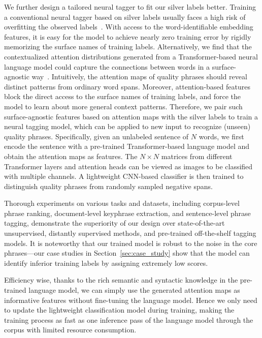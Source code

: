 \documentclass[sigconf]{acmart}
\begin{document}
We further design a tailored neural tagger to fit our silver labels better. 
Training a conventional neural tagger based on silver labels usually faces a high risk of overfitting the observed labels~\cite{liang2020bond}.
With access to the word-identifiable embedding features, it is easy for the model to achieve nearly zero training error by rigidly memorizing the surface names of training labels.
Alternatively, we find that the contextualized attention distributions generated from a Transformer-based neural language model could capture the connections between words in a surface-agnostic way~\cite{kim2019pre}.
Intuitively, the attention maps of quality phrases should reveal distinct patterns from ordinary word spans.
Moreover, attention-based features block the direct access to the surface names of training labels, and force the model to learn about more general context patterns.
Therefore, we pair such surface-agnostic features based on attention maps with the silver labels to train a neural tagging model, which can be applied to new input to recognize (unseen) quality phrases.
Specifically, given an unlabeled sentence of $N$ words, we first encode the sentence with a pre-trained Transformer-based language model and obtain the attention maps as features.
The $N \times N$ matrices from different Transformer layers and attention heads can be viewed as images to be classified with multiple channels.
A lightweight CNN-based classifier is then trained to distinguish quality phrases from randomly sampled negative spans.

Thorough experiments on various tasks and datasets, including corpus-level phrase ranking, document-level keyphrase extraction, and sentence-level phrase tagging, demonstrate the superiority of our design over state-of-the-art unsupervised, distantly supervised methods, and pre-trained off-the-shelf tagging models.
It is noteworthy that our trained model is robust to the noise in the core phrases---our case studies in Section~\ref{sec:case_study} show that the model can identify inferior training labels by assigning extremely low scores.

Efficiency wise, thanks to the rich semantic and syntactic knowledge in the pre-trained language model, we can simply use the generated attention maps as informative features without fine-tuning the language model.
Hence we only need to update the lightweight classification model during training, making the training process as fast as one inference pass of the language model through the corpus with limited resource consumption.
\end{document}
